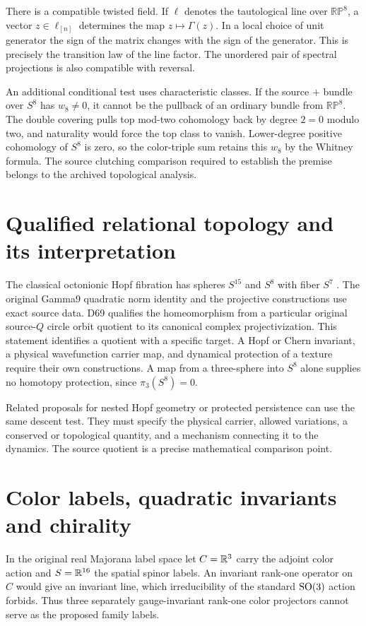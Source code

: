 There is a compatible twisted field. If $\ell$ denotes the tautological line over $\mathbb{RP}^8$, a vector $z\in\ell_{[n]}$ determines the map $z\mapsto\Gamma(z)$. In a local choice of unit generator the sign of the matrix changes with the sign of the generator. This is precisely the transition law of the line factor. The unordered pair of spectral projections is also compatible with reversal.

An additional conditional test uses characteristic classes. If the source $+$ bundle over $S^8$ has $w_8\ne0$, it cannot be the pullback of an ordinary bundle from $\mathbb{RP}^8$. The double covering pulls top mod-two cohomology back by degree $2=0$ modulo two, and naturality would force the top class to vanish. Lower-degree positive cohomology of $S^8$ is zero, so the color-triple sum retains this $w_8$ by the Whitney formula. The source clutching comparison required to establish the premise belongs to the archived topological analysis.

\section{Qualified relational topology and its interpretation}
The classical octonionic Hopf fibration has spheres $S^{15}$ and $S^8$ with fiber $S^7$ \cite{gwz}. The original Gamma9 quadratic norm identity and the projective constructions use exact source data. D69 qualifies the homeomorphism from a particular original source-$Q$ circle orbit quotient to its canonical complex projectivization. This statement identifies a quotient with a specific target. A Hopf or Chern invariant, a physical wavefunction carrier map, and dynamical protection of a texture require their own constructions. A map from a three-sphere into $S^8$ alone supplies no homotopy protection, since $\pi_3(S^8)=0$.

Related proposals for nested Hopf geometry or protected persistence can use the same descent test. They must specify the physical carrier, allowed variations, a conserved or topological quantity, and a mechanism connecting it to the dynamics. The source quotient is a precise mathematical comparison point.

\section{Color labels, quadratic invariants and chirality}
In the original real Majorana label space let $C=\mathbb R^3$ carry the adjoint color action and $S=\mathbb R^{16}$ the spatial spinor labels. An invariant rank-one operator on $C$ would give an invariant line, which irreducibility of the standard $\operatorname{SO}(3)$ action forbids. Thus three separately gauge-invariant rank-one color projectors cannot serve as the proposed family labels.


